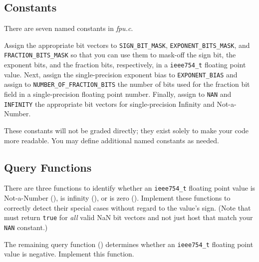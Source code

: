 \subsection{Constants}

There are seven named constants in \textit{fpu.c}.

Assign the appropriate bit vectors to \lstinline{SIGN_BIT_MASK}, \lstinline{EXPONENT_BITS_MASK}, and \lstinline{FRACTION_BITS_MASK} so that you can use them to mask-off the sign bit, the exponent bits, and the fraction bits, respectively, in a \lstinline{ieee754_t} floating point value.
Next, assign the single-precision exponent bias to \lstinline{EXPONENT_BIAS} and assign to \lstinline{NUMBER_OF_FRACTION_BITS} the number of bits used for the fraction bit field in a single-precision floating point number.
Finally, assign to \lstinline{NAN} and \lstinline{INFINITY} the appropriate bit vectors for single-precision Infinity and Not-a-Number.

These constants will not be graded directly;
they exist solely to make your code more readable.
You may define additional named constants as needed.

\subsection{Query Functions}

There are three functions to identify whether an \lstinline{ieee754_t} floating point value is Not-a-Number (), is infinity (), or is zero ().
Implement these functions to correctly detect their special cases without regard to the value's sign.
(Note that  must return \lstinline{true} for \textit{all} valid NaN bit vectors and not just host that match your \lstinline{NAN} constant.)

The remaining query function () determines whether an \lstinline{ieee754_t} floating point value is negative.
Implement this function.